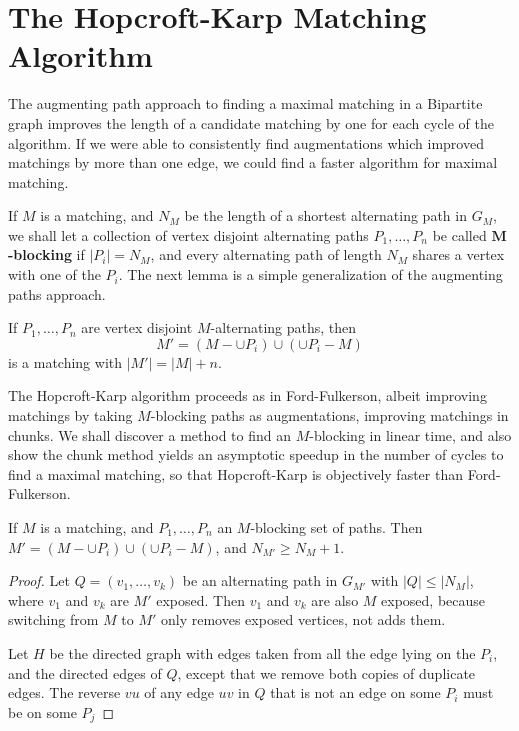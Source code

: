 \section{The Hopcroft-Karp Matching Algorithm}

The augmenting path approach to finding a maximal matching in a Bipartite graph improves the length of a candidate matching by one for each cycle of the algorithm. If we were able to consistently find augmentations which improved matchings by more than one edge, we could find a faster algorithm for maximal matching.

If $M$ is a matching, and $N_M$ be the length of a shortest alternating path in $G_M$, we shall let a collection of vertex disjoint alternating paths $P_1, \dots, P_n$ be called {\bf $\mathbf{M}$-blocking} if $|P_i| = N_M$, and every alternating path of length $N_M$ shares a vertex with one of the $P_i$. The next lemma is a simple generalization of the augmenting paths approach.

\begin{theorem}
    If $P_1, \dots, P_n$ are vertex disjoint $M$-alternating paths, then
    \[ M' = (M - \cup P_i) \cup (\cup P_i - M) \]
    is a matching with $|M'| = |M| + n$.
\end{theorem}

The Hopcroft-Karp algorithm proceeds as in Ford-Fulkerson, albeit improving matchings by taking $M$-blocking paths as augmentations, improving matchings in chunks. We shall discover a method to find an $M$-blocking in linear time, and also show the chunk method yields an asymptotic speedup in the number of cycles to find a maximal matching, so that Hopcroft-Karp is objectively faster than Ford-Fulkerson.

\begin{lemma}
    If $M$ is a matching, and $P_1, \dots, P_n$ an $M$-blocking set of paths. Then $M' = (M - \cup P_i) \cup (\cup P_i - M)$, and $N_{M'} \geq N_M + 1$.
\end{lemma}
\begin{proof}
    Let $Q = (v_1, \dots, v_k)$ be an alternating path in $G_{M'}$ with $|Q| \leq |N_M|$, where $v_1$ and $v_k$ are $M'$ exposed. Then $v_1$ and $v_k$ are also $M$ exposed, because switching from $M$ to $M'$ only removes exposed vertices, not adds them.

    Let $H$ be the directed graph with edges taken from all the edge lying on the $P_i$, and the directed edges of $Q$, except that we remove both copies of duplicate edges. The reverse $vu$ of any edge $uv$ in $Q$ that is not an edge on some $P_i$ must be on some $P_j$
\end{proof}

